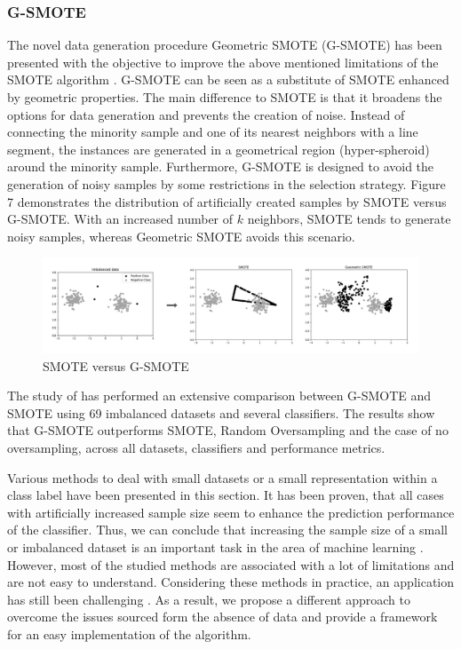 \documentclass[parskip=full]{scrartcl}
\begin{document}
\subsubsection{G-SMOTE}

The novel data generation procedure Geometric SMOTE (G-SMOTE) has been 
presented with the objective to improve the above mentioned limitations of the 
SMOTE algorithm \cite{Douzas.2019b}. G-SMOTE can be seen as a substitute of 
SMOTE enhanced by geometric properties. The main difference to SMOTE is that 
it broadens the options for data generation and 
prevents the creation of noise. Instead of connecting the minority sample and one of 
its nearest neighbors with a line segment, the instances are 
generated in a geometrical region (hyper-spheroid) around the minority sample. 
Furthermore, G-SMOTE is designed to avoid the generation of noisy samples by 
some restrictions in the selection strategy. Figure 7 demonstrates the 
distribution of artificially created samples by SMOTE versus G-SMOTE. With an 
increased number of $\mathit{k}$ neighbors, SMOTE tends to generate noisy 
samples, whereas Geometric SMOTE avoids this scenario.

\begin{figure}[H]
	\centering
	\includegraphics[width=1\linewidth]{./resources/smote_vs_gsmote}
	\caption{SMOTE versus G-SMOTE \cite{Douzas.2019}}
	\label{fig:smotevsgsmote}
\end{figure}

The study of \cite{Douzas.2019b} has performed an extensive comparison between 
G-SMOTE and SMOTE using 69 imbalanced datasets and several classifiers. The 
results show that G-SMOTE outperforms SMOTE, Random Oversampling and the case 
of no oversampling, across all datasets, classifiers and performance 
metrics.    

Various methods to deal with small datasets or a small representation 
within a class label have been presented in this section. It has been proven, 
that all cases with artificially increased sample size seem to enhance the 
prediction performance of the classifier. Thus, we can conclude 
that increasing the sample size of a small or imbalanced dataset is an 
important task in the area of machine learning \cite{Ruparel.2013}. However, 
most of the studied methods are associated with a lot of limitations and are 
not easy to understand. Considering these methods in practice, an application 
has still been challenging \cite{Sezer.2014}. As a result, we propose a 
different approach to overcome the issues sourced form the absence of data and 
provide a framework for an easy implementation of the algorithm.
\end{document}
